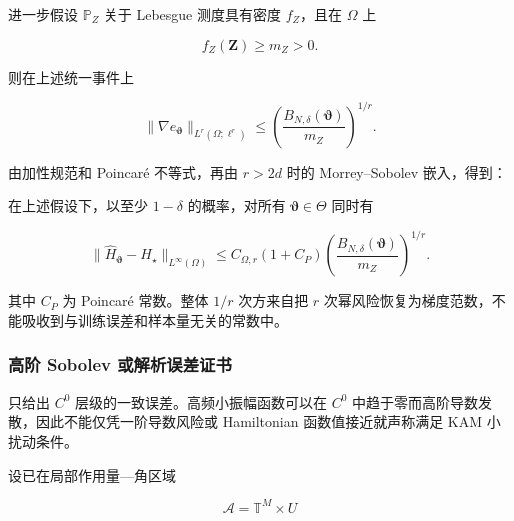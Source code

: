 进一步假设 \(\mathbb{P}_{Z}\) 关于 Lebesgue 测度具有密度 \(f_{Z}\)，且在 \(\Omega\) 上

\begin{equation}
\label{eq:chnn-4-47}
f_{Z}\left( \mathbf{Z} \right) \geq m_{Z} > 0.
\end{equation}

则在上述统一事件上

\begin{equation}
\label{eq:chnn-4-48}
\left. \parallel\nabla e_{\bm{\vartheta}} \right.\parallel_{L^{r}\left( \Omega;\ell^{r} \right)} \leq \left( \frac{B_{N,\delta}\left( \bm{\vartheta} \right)}{m_{Z}} \right)^{1/r}.
\end{equation}

由加性规范和 Poincaré 不等式，再由 \(r > 2d\) 时的 Morrey--Sobolev 嵌入\cite{AdamsFournier2003SobolevSpaces}，得到：

\begin{theorem}\label{thm:hamiltonian-uniform-generalization}
在上述假设下，以至少 \(1 - \delta\) 的概率，对所有 \(\bm{\vartheta} \in \Theta\) 同时有

\begin{equation}
\label{eq:chnn-4-49}
\boxed{\left. \parallel{\widehat{H}}_{\bm{\vartheta}} - H_{\star} \right.\parallel_{L^{\infty}(\Omega)} \leq C_{\Omega,r}\left( 1 + C_{P} \right)\left( \frac{B_{N,\delta}\left( \bm{\vartheta} \right)}{m_{Z}} \right)^{1/r}.}
\end{equation}
\end{theorem}

其中 \(C_{P}\) 为 Poincaré 常数。整体 \(1/r\) 次方来自把 \(r\) 次幂风险恢复为梯度范数，不能吸收到与训练误差和样本量无关的常数中。

\subsubsection{高阶 Sobolev 或解析误差证书}\label{sec:chnn-4-6-5}

只给出 \(C^{0}\) 层级的一致误差。高频小振幅函数可以在 \(C^{0}\) 中趋于零而高阶导数发散，因此不能仅凭一阶导数风险或 Hamiltonian 函数值接近就声称满足 KAM 小扰动条件。

设已在局部作用量---角区域

\begin{equation}
\label{eq:chnn-4-50}
\mathcal{A} = \mathbb{T}^{M} \times U
\end{equation}

